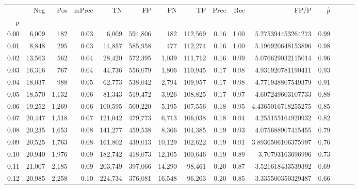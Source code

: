\begin{tabular}{rrrrrrrrrrrrrrr}
\toprule
{} &     Neg &    Pos & mPrec &       TN &       FP &       FN &       TP &  Prec &   Rec &                  FP/P & $\hat{p}$ \\
p    &         &        &       &          &          &          &          &       &       &                       &           \\
\midrule
0.00 &   6,009 &    182 &  0.03 &    6,009 &  594,806 &      182 &  112,569 &  0.16 &  1.00 &     5.275394453264273 &      0.99 \\
0.01 &   8,848 &    295 &  0.03 &   14,857 &  585,958 &      477 &  112,274 &  0.16 &  1.00 &     5.196920648153896 &      0.98 \\
0.02 &  13,563 &    562 &  0.04 &   28,420 &  572,395 &    1,039 &  111,712 &  0.16 &  0.99 &     5.076629032115014 &      0.96 \\
0.03 &  16,316 &    767 &  0.04 &   44,736 &  556,079 &    1,806 &  110,945 &  0.17 &  0.98 &     4.931920781190411 &      0.93 \\
0.04 &  18,037 &    988 &  0.05 &   62,773 &  538,042 &    2,794 &  109,957 &  0.17 &  0.98 &     4.771948807549379 &      0.91 \\
0.05 &  18,570 &  1,132 &  0.06 &   81,343 &  519,472 &    3,926 &  108,825 &  0.17 &  0.97 &     4.607249603107733 &      0.88 \\
0.06 &  19,252 &  1,269 &  0.06 &  100,595 &  500,220 &    5,195 &  107,556 &  0.18 &  0.95 &    4.4365016718255275 &      0.85 \\
0.07 &  20,447 &  1,518 &  0.07 &  121,042 &  479,773 &    6,713 &  106,038 &  0.18 &  0.94 &     4.255155164920932 &      0.82 \\
0.08 &  20,235 &  1,653 &  0.08 &  141,277 &  459,538 &    8,366 &  104,385 &  0.19 &  0.93 &     4.075688907415455 &      0.79 \\
0.09 &  20,525 &  1,763 &  0.08 &  161,802 &  439,013 &   10,129 &  102,622 &  0.19 &  0.91 &    3.8936506106375997 &      0.76 \\
0.10 &  20,940 &  1,976 &  0.09 &  182,742 &  418,073 &   12,105 &  100,646 &  0.19 &  0.89 &      3.70793163696996 &      0.73 \\
0.11 &  21,007 &  2,185 &  0.09 &  203,749 &  397,066 &   14,290 &   98,461 &  0.20 &  0.87 &     3.521618433539392 &      0.69 \\
0.12 &  20,985 &  2,258 &  0.10 &  224,734 &  376,081 &   16,548 &   96,203 &  0.20 &  0.85 &     3.335500350329487 &      0.66 \\

\end{tabular}
